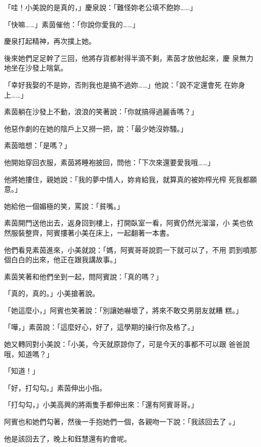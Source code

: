 「哇！小美說的是真的，」慶泉說：「難怪妳老公填不飽妳……」

「快嘛……」素茵催他：「你說你愛我的……」

慶泉打起精神，再次撲上她。

後來她們足足幹了三回，他將存貨都射得半滴不剩，素茵才放他起來，慶
泉無力地坐在沙發上喘氣。

「幸好我娶的不是妳，否則我也是搞不過妳……」他說：「說不定還會死
在妳身上……」

素茵躺在沙發上不動，浪浪的笑著說：「你就搞得過麗香嗎？」

他惡作劇的在她的陰戶上又撈一把，說：「最少她沒妳騷。」

素茵暗想：「是嗎？」

他開始穿回衣服，素茵將睡袍披回，問他：「下次來還要愛我哦……」

他將她摟住，親她說：「我的夢中情人，妳肯給我，就算真的被妳榨光榨
死我都願意。」

她給他一個媚極的笑，罵說：「貧嘴。」

素茵開門送他出去，返身回到樓上，打開臥室一看，阿賓仍然光溜溜，小
美也依然服裝整齊，阿賓摟著小美在床上，一起翻著一本書。

他們看見素茵進來，小美就說：「媽，阿賓哥哥說罰一下就可以了，不用
罰到噴那個白白的出來，他正在跟我講故事。」

素茵笑著和他們坐到一起，問阿賓說：「真的嗎？」

「真的，真的。」小美搶著說。

「她這麼小，」阿賓也笑著說：「別讓她嚇壞了，將來不敢交男朋友就糟
糕。」

「嘩，」素茵說：「這麼好心，好了，這學期的操行你及格了。」

她又轉同對小美說：「小美，今天就原諒你了，可是今天的事都不可以跟
爸爸說哦，知道嗎？」

「知道！」

「好，打勾勾。」素茵伸出小指。

「打勾勾，」小美高興的將兩隻手都伸出來：「還有阿賓哥哥。」

阿賓也和她們勾著，然後一手抱她們一個，各親吻一下說：「我該回去了
。」

他是該回去了，晚上和鈺慧還有約會呢。










